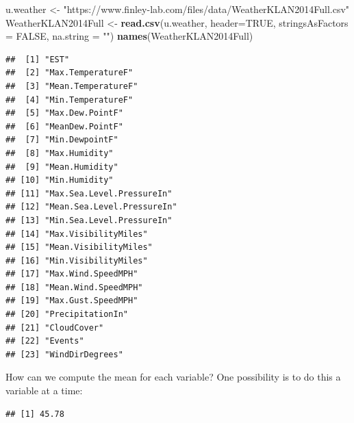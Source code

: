 \documentclass[
]{krantz}
\newenvironment{Shaded}{\begin{snugshade}}{\end{snugshade}}
\newcommand{\DataTypeTok}[1]{\textcolor[rgb]{0.13,0.29,0.53}{#1}}
\newcommand{\KeywordTok}[1]{\textcolor[rgb]{0.13,0.29,0.53}{\textbf{#1}}}
\newcommand{\NormalTok}[1]{#1}
\newcommand{\OperatorTok}[1]{\textcolor[rgb]{0.81,0.36,0.00}{\textbf{#1}}}
\newcommand{\OtherTok}[1]{\textcolor[rgb]{0.56,0.35,0.01}{#1}}
\newcommand{\StringTok}[1]{\textcolor[rgb]{0.31,0.60,0.02}{#1}}
\begin{document}
\begin{Shaded}
\begin{Highlighting}[]
\NormalTok{u.weather \textless{}{-}}\StringTok{ "https://www.finley{-}lab.com/files/data/WeatherKLAN2014Full.csv"}
\NormalTok{WeatherKLAN2014Full \textless{}{-}}\StringTok{ }\KeywordTok{read.csv}\NormalTok{(u.weather, }\DataTypeTok{header=}\OtherTok{TRUE}\NormalTok{, }
                               \DataTypeTok{stringsAsFactors =} \OtherTok{FALSE}\NormalTok{, }
                               \DataTypeTok{na.string =} \StringTok{""}\NormalTok{)}
\KeywordTok{names}\NormalTok{(WeatherKLAN2014Full)}
\end{Highlighting}
\end{Shaded}

\begin{verbatim}
##  [1] "EST"                      
##  [2] "Max.TemperatureF"         
##  [3] "Mean.TemperatureF"        
##  [4] "Min.TemperatureF"         
##  [5] "Max.Dew.PointF"           
##  [6] "MeanDew.PointF"           
##  [7] "Min.DewpointF"            
##  [8] "Max.Humidity"             
##  [9] "Mean.Humidity"            
## [10] "Min.Humidity"             
## [11] "Max.Sea.Level.PressureIn" 
## [12] "Mean.Sea.Level.PressureIn"
## [13] "Min.Sea.Level.PressureIn" 
## [14] "Max.VisibilityMiles"      
## [15] "Mean.VisibilityMiles"     
## [16] "Min.VisibilityMiles"      
## [17] "Max.Wind.SpeedMPH"        
## [18] "Mean.Wind.SpeedMPH"       
## [19] "Max.Gust.SpeedMPH"        
## [20] "PrecipitationIn"          
## [21] "CloudCover"               
## [22] "Events"                   
## [23] "WindDirDegrees"
\end{verbatim}

How can we compute the mean for each variable? One possibility is to do this a variable at a time:

\begin{Shaded}
\end{Shaded}

\begin{verbatim}
## [1] 45.78
\end{verbatim}

\begin{Shaded}
\end{Shaded}
\end{document}
